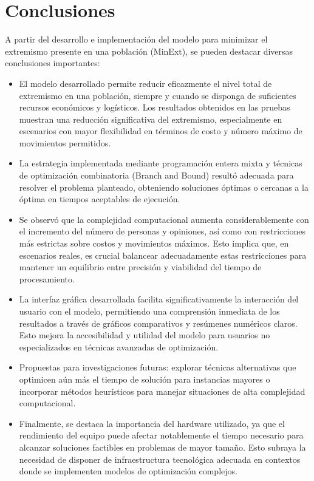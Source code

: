 \documentclass[11pt,letter]{article}
\begin{document}
\section{Conclusiones}

A partir del desarrollo e implementación del modelo para minimizar el extremismo presente en una población (MinExt), se pueden destacar diversas conclusiones importantes:

\begin{itemize}
    \item El modelo desarrollado permite reducir eficazmente el nivel total de extremismo en una población, siempre y cuando se disponga de suficientes recursos económicos y logísticos. Los resultados obtenidos en las pruebas muestran una reducción significativa del extremismo, especialmente en escenarios con mayor flexibilidad en términos de costo y número máximo de movimientos permitidos.

    \item La estrategia implementada mediante programación entera mixta y técnicas de optimización combinatoria (Branch and Bound) resultó adecuada para resolver el problema planteado, obteniendo soluciones óptimas o cercanas a la óptima en tiempos aceptables de ejecución.

    \item Se observó que la complejidad computacional aumenta considerablemente con el incremento del número de personas y opiniones, así como con restricciones más estrictas sobre costos y movimientos máximos. Esto implica que, en escenarios reales, es crucial balancear adecuadamente estas restricciones para mantener un equilibrio entre precisión y viabilidad del tiempo de procesamiento.

    \item La interfaz gráfica desarrollada facilita significativamente la interacción del usuario con el modelo, permitiendo una comprensión inmediata de los resultados a través de gráficos comparativos y resúmenes numéricos claros. Esto mejora la accesibilidad y utilidad del modelo para usuarios no especializados en técnicas avanzadas de optimización.

    \item Propuestas para investigaciones futuras: explorar técnicas alternativas que optimicen aún más el tiempo de solución para instancias mayores o incorporar métodos heurísticos para manejar situaciones de alta complejidad computacional.

    \item Finalmente, se destaca la importancia del hardware utilizado, ya que el rendimiento del equipo puede afectar notablemente el tiempo necesario para alcanzar soluciones factibles en problemas de mayor tamaño. Esto subraya la necesidad de disponer de infraestructura tecnológica adecuada en contextos donde se implementen modelos de optimización complejos.



\end{itemize}
\end{document}
